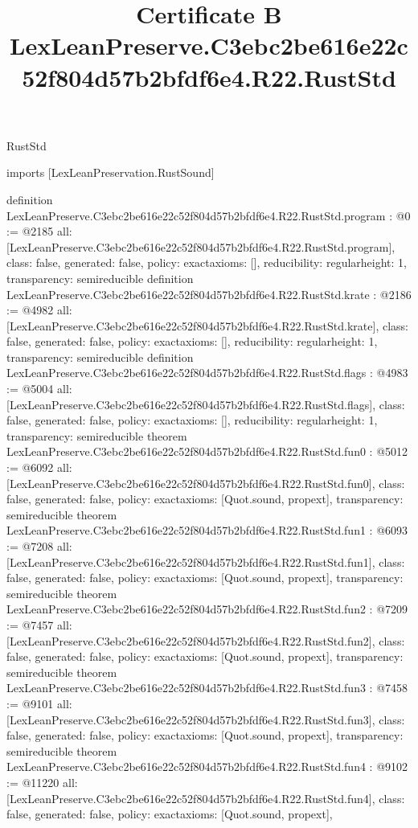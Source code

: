 \begin{lexlean}{RustStd}
\title{Certificate B LexLeanPreserve.C3ebc2be616e22c52f804d57b2bfdf6e4.R22.RustStd}
\begin{coremodule}
imports [LexLeanPreservation.RustSound]

definition LexLeanPreserve.C3ebc2be616e22c52f804d57b2bfdf6e4.R22.RustStd.program : @0 := @2185 {
  all: [LexLeanPreserve.C3ebc2be616e22c52f804d57b2bfdf6e4.R22.RustStd.program],
  class: false,
  generated: false,
  policy: exact{axioms: []},
  reducibility: regular{height: 1},
  transparency: semireducible
}
definition LexLeanPreserve.C3ebc2be616e22c52f804d57b2bfdf6e4.R22.RustStd.krate : @2186 := @4982 {
  all: [LexLeanPreserve.C3ebc2be616e22c52f804d57b2bfdf6e4.R22.RustStd.krate],
  class: false,
  generated: false,
  policy: exact{axioms: []},
  reducibility: regular{height: 1},
  transparency: semireducible
}
definition LexLeanPreserve.C3ebc2be616e22c52f804d57b2bfdf6e4.R22.RustStd.flags : @4983 := @5004 {
  all: [LexLeanPreserve.C3ebc2be616e22c52f804d57b2bfdf6e4.R22.RustStd.flags],
  class: false,
  generated: false,
  policy: exact{axioms: []},
  reducibility: regular{height: 1},
  transparency: semireducible
}
theorem LexLeanPreserve.C3ebc2be616e22c52f804d57b2bfdf6e4.R22.RustStd.fun0 : @5012 := @6092 {
  all: [LexLeanPreserve.C3ebc2be616e22c52f804d57b2bfdf6e4.R22.RustStd.fun0],
  class: false,
  generated: false,
  policy: exact{axioms: [Quot.sound, propext]},
  transparency: semireducible
}
theorem LexLeanPreserve.C3ebc2be616e22c52f804d57b2bfdf6e4.R22.RustStd.fun1 : @6093 := @7208 {
  all: [LexLeanPreserve.C3ebc2be616e22c52f804d57b2bfdf6e4.R22.RustStd.fun1],
  class: false,
  generated: false,
  policy: exact{axioms: [Quot.sound, propext]},
  transparency: semireducible
}
theorem LexLeanPreserve.C3ebc2be616e22c52f804d57b2bfdf6e4.R22.RustStd.fun2 : @7209 := @7457 {
  all: [LexLeanPreserve.C3ebc2be616e22c52f804d57b2bfdf6e4.R22.RustStd.fun2],
  class: false,
  generated: false,
  policy: exact{axioms: [Quot.sound, propext]},
  transparency: semireducible
}
theorem LexLeanPreserve.C3ebc2be616e22c52f804d57b2bfdf6e4.R22.RustStd.fun3 : @7458 := @9101 {
  all: [LexLeanPreserve.C3ebc2be616e22c52f804d57b2bfdf6e4.R22.RustStd.fun3],
  class: false,
  generated: false,
  policy: exact{axioms: [Quot.sound, propext]},
  transparency: semireducible
}
theorem LexLeanPreserve.C3ebc2be616e22c52f804d57b2bfdf6e4.R22.RustStd.fun4 : @9102 := @11220 {
  all: [LexLeanPreserve.C3ebc2be616e22c52f804d57b2bfdf6e4.R22.RustStd.fun4],
  class: false,
  generated: false,
  policy: exact{axioms: [Quot.sound, propext]},
}
\end{coremodule}
\end{lexlean}

